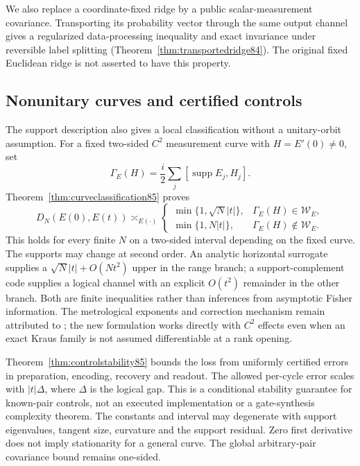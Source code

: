 We also replace a coordinate-fixed ridge by a public scalar-measurement
covariance.  Transporting its probability vector through the same
output channel gives a regularized data-processing inequality and
exact invariance under reversible label splitting
(Theorem~\ref{thm:transportedridge84}).  The original fixed Euclidean
ridge is not asserted to have this property.

\subsection{Nonunitary curves and certified controls}
The support description also gives a local classification without a
unitary-orbit assumption.  For a fixed two-sided $C^2$ measurement curve
with $H=E'(0)\ne0$, set
\[
 \Gamma_E(H)=\frac i2\sum_j[\operatorname{supp}E_j,H_j].
\]
Theorem~\ref{thm:curveclassification85} proves
\[
 D_N(E(0),E(t))\asymp_{E(\cdot)}
 \begin{cases}
 \min\{1,\sqrt N|t|\},&\Gamma_E(H)\in\mathcal W_E,\\
 \min\{1,N|t|\},&\Gamma_E(H)\notin\mathcal W_E.
 \end{cases}
\]
This holds for every finite $N$ on a two-sided interval depending on
the fixed curve.  The supports may change at second order.  An analytic
horizontal surrogate supplies a $\sqrt N|t|+O(Nt^2)$ upper in the
range branch; a support-complement code supplies a logical channel
with an explicit $O(t^2)$ remainder in the other branch.  Both are
finite inequalities rather than inferences from asymptotic Fisher
information.  The metrological exponents and correction mechanism
remain attributed to \cite{ZJ84,KL84}; the new formulation works
directly with $C^2$ effects even when an exact Kraus family is not
assumed differentiable at a rank opening.

Theorem~\ref{thm:controlstability85} bounds the loss from uniformly
certified errors in preparation, encoding, recovery and readout.
The allowed per-cycle error scales with $|t|\Delta$, where $\Delta$
is the logical gap.  This is a conditional stability guarantee for
known-pair controls, not an executed implementation or a gate-synthesis
complexity theorem.  The constants and interval may degenerate with
support eigenvalues, tangent size, curvature and the support residual.
Zero first derivative does not imply stationarity for a general curve.
The global arbitrary-pair covariance bound remains one-sided.


